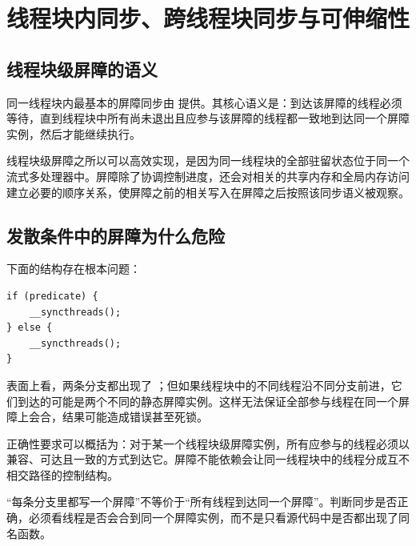 \section{线程块内同步、跨线程块同步与可伸缩性}

\subsection{线程块级屏障的语义}

同一线程块内最基本的屏障同步由  提供。其核心语义是：到达该屏障的线程必须等待，直到线程块中所有尚未退出且应参与该屏障的线程都一致地到达同一个屏障实例，然后才能继续执行。

\begin{mechanismbox}
线程块级屏障之所以可以高效实现，是因为同一线程块的全部驻留状态位于同一个流式多处理器中。屏障除了协调控制进度，还会对相关的共享内存和全局内存访问建立必要的顺序关系，使屏障之前的相关写入在屏障之后按照该同步语义被观察。
\end{mechanismbox}

\subsection{发散条件中的屏障为什么危险}

\par\noindent\begin{minipage}{\linewidth}
下面的结构存在根本问题：

\begin{lstlisting}[caption={发散条件中的两个不同屏障实例}]
if (predicate) {
    __syncthreads();
} else {
    __syncthreads();
}
\end{lstlisting}
\end{minipage}\par

表面上看，两条分支都出现了 ；但如果线程块中的不同线程沿不同分支前进，它们到达的可能是两个不同的静态屏障实例。这样无法保证全部参与线程在同一个屏障上会合，结果可能造成错误甚至死锁。

正确性要求可以概括为：对于某一个线程块级屏障实例，所有应参与的线程必须以兼容、可达且一致的方式到达它。屏障不能依赖会让同一线程块中的线程分成互不相交路径的控制结构。

\begin{warningbox}
“每条分支里都写一个屏障”不等价于“所有线程到达同一个屏障”。判断同步是否正确，必须看线程是否会合到同一个屏障实例，而不是只看源代码中是否都出现了同名函数。
\end{warningbox}

